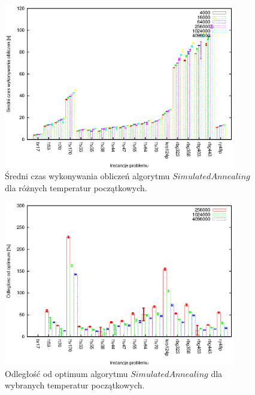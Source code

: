 \begin{figure}
\begin{center}
\includegraphics[width=0.9\textwidth]{wykresy/anealing1}
\end{center}
\caption{Średni czas wykonywania obliczeń algorytmu $Simulated Annealing$
dla różnych temperatur początkowych.}
\label{annealing1}
\end{figure}

\begin{figure}
\begin{center}
\includegraphics[width=0.9\textwidth]{wykresy/anealing2}
\end{center}
\caption{Odległość od optimum algorytmu $Simulated Annealing$ dla wybranych 
temperatur początkowych.}
\label{annealing2}
\end{figure}

